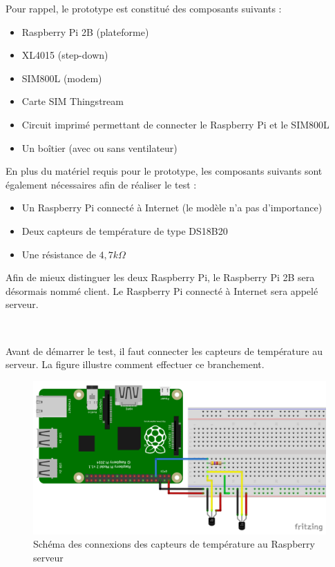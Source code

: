 Pour rappel, le prototype est constitué des composants suivants :

\begin{itemize}
  \item Raspberry Pi 2B (plateforme)
  \item XL4015 (step-down)
  \item SIM800L (modem)
  \item Carte SIM Thingstream
  \item Circuit imprimé permettant de connecter le Raspberry Pi et le SIM800L
  \item	Un boîtier (avec ou sans ventilateur)
\end{itemize}

\noindent
En plus du matériel requis pour le prototype, les composants suivants sont également nécessaires afin de réaliser le test :

\begin{itemize}
  \item Un Raspberry Pi connecté à Internet (le modèle n'a pas d'importance)
  \item Deux capteurs de température de type DS18B20
  \item Une résistance de $4,7 k\Omega$
\end{itemize}

\noindent
Afin de mieux distinguer les deux Raspberry Pi, le Raspberry Pi 2B sera désormais nommé client. Le Raspberry Pi connecté à Internet sera appelé serveur.

~

\noindent
Avant de démarrer le test, il faut connecter les capteurs de température au serveur. La figure illustre comment effectuer ce branchement.

\begin{figure}
  \includegraphics[width=\textwidth]{img/el_prototype/test_conn.png}
  \caption{Schéma des connexions des capteurs de température au Raspberry serveur}
  \label{fig:connnn}
\end{figure}

